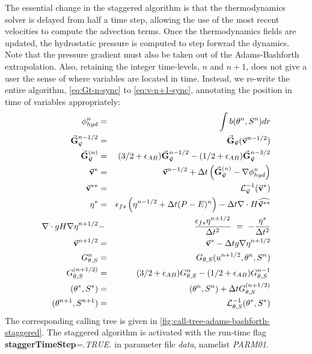 The essential change in the staggered algorithm is that the 
thermodynamics solver is delayed from half a time step, 
allowing the use of the most recent velocities to compute 
the advection terms. Once the thermodynamics fields are
updated, the hydrostatic pressure is computed 
to step forwrad the dynamics.
Note that the pressure gradient must also be taken out of the
Adams-Bashforth extrapolation. Also, retaining the integer time-levels,
$n$ and $n+1$, does not give a user the sense of where variables are
located in time.  Instead, we re-write the entire algorithm,
\ref{eq:Gt-n-sync} to \ref{eq:v-n+1-sync}, annotating the
position in time of variables appropriately:
\begin{eqnarray}
\phi^{n}_{hyd} & = & \int b(\theta^{n},S^{n}) dr
\label{eq:phi-hyd-staggered} \\
\vec{\bf G}_{\vec{\bf v}}^{n-1/2} & = & \vec{\bf G}_{\vec{\bf v}} ( \vec{\bf v}^{n-1/2} )
\label{eq:Gv-n-staggered} \\
\vec{\bf G}_{\vec{\bf v}}^{(n)} & = & (3/2 + \epsilon_{AB} ) \vec{\bf G}_{\vec{\bf v}}^{n-1/2} - (1/2 + \epsilon_{AB} ) \vec{\bf G}_{\vec{\bf v}}^{n-3/2}
\label{eq:Gv-n+5-staggered} \\
\vec{\bf v}^{*} & = & \vec{\bf v}^{n-1/2} + \Delta t \left( \vec{\bf G}_{\vec{\bf v}}^{(n)} - \nabla \phi_{hyd}^{n} \right)
\label{eq:vstar-staggered} \\
\vec{\bf v}^{**} & = & {\cal L}_{\vec{\bf v}}^{-1} ( \vec{\bf v}^* )
\label{eq:vstarstar-staggered} \\
\eta^* & = & \epsilon_{fs} \left( \eta^{n-1/2} + \Delta t (P-E)^n \right)- \Delta t 
  \nabla \cdot H \widehat{ \vec{\bf v}^{**} }
\label{eq:nstar-staggered} \\
\nabla \cdot g H \nabla \eta^{n+1/2} & - & \frac{\epsilon_{fs} \eta^{n+1/2}}{\Delta t^2}
~ = ~ - \frac{\eta^*}{\Delta t^2}
\label{eq:elliptic-staggered} \\
\vec{\bf v}^{n+1/2} & = & \vec{\bf v}^{*} - \Delta t g \nabla \eta^{n+1/2}
\label{eq:v-n+1-staggered} \\
G_{\theta,S}^{n} & = & G_{\theta,S} ( u^{n+1/2}, \theta^{n}, S^{n} )
\label{eq:Gt-n-staggered} \\
G_{\theta,S}^{(n+1/2)} & = & (3/2+\epsilon_{AB}) G_{\theta,S}^{n}-(1/2+\epsilon_{AB}) G_{\theta,S}^{n-1}
\label{eq:Gt-n+5-staggered} \\
(\theta^*,S^*) & = & (\theta^{n},S^{n}) + \Delta t G_{\theta,S}^{(n+1/2)}
\label{eq:tstar-staggered} \\
(\theta^{n+1},S^{n+1}) & = & {\cal L}^{-1}_{\theta,S} (\theta^*,S^*)
\label{eq:t-n+1-staggered}
\end{eqnarray}
The corresponding calling tree is given in
\ref{fig:call-tree-adams-bashforth-staggered}.
The staggered algorithm is activated with the run-time flag 
{\bf staggerTimeStep}{\em=.TRUE.} in parameter file {\em data},
namelist {\em PARM01}.


